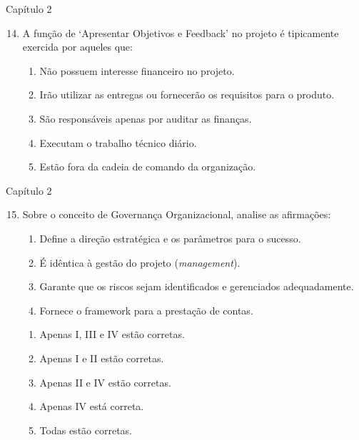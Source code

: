 \documentclass{beamer}
\begin{document}
\begin{frame}{Capítulo 2}
	\begin{enumerate}
		\setcounter{enumi}{13}
		\justifying
		\item A função de `Apresentar Objetivos e Feedback' no projeto é tipicamente exercida por aqueles que:
		\begin{enumerate}[a]
			\justifying
			\item Não possuem interesse financeiro no projeto.
			\item \alert<2>{Irão utilizar as entregas ou fornecerão os requisitos para o produto}.
			\item São responsáveis apenas por auditar as finanças.
			\item Executam o trabalho técnico diário.
			\item Estão fora da cadeia de comando da organização.
		\end{enumerate}
	\end{enumerate}
\end{frame}

\begin{frame}{Capítulo 2}
	\begin{enumerate}
		\setcounter{enumi}{14}
		\justifying
		\item Sobre o conceito de Governança Organizacional, analise as afirmações:
		
		\begin{enumerate}[I]
			\item Define a direção estratégica e os parâmetros para o sucesso.
			\item É idêntica à gestão do projeto (\textit{management}).
			\item Garante que os riscos sejam identificados e gerenciados adequadamente.
			\item Fornece o framework para a prestação de contas.
		\end{enumerate}
		
		\vspace{10pt}
		\begin{enumerate}[a]
			\item \alert<2>{Apenas I, III e IV estão corretas}.
			\item Apenas I e II estão corretas.
			\item Apenas II e IV estão corretas.
			\item Apenas IV está correta.
			\item Todas estão corretas.
		\end{enumerate}
	\end{enumerate}
\end{frame}
\end{document}
